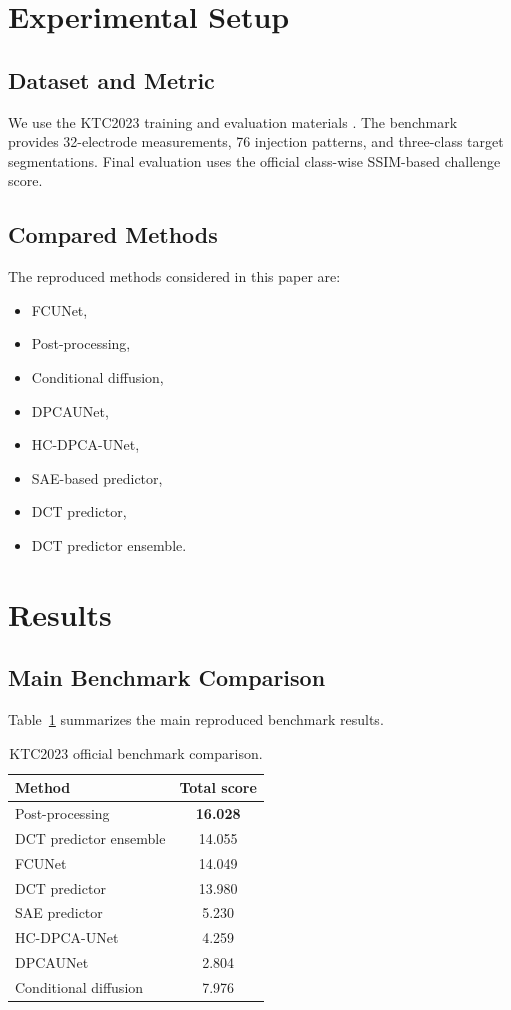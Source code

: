\documentclass[11pt,a4paper]{article}
\begin{document}
\section{Experimental Setup}
\subsection{Dataset and Metric}
We use the KTC2023 training and evaluation materials \cite{rasanen2023kuopio}. The benchmark provides 32-electrode measurements, 76 injection patterns, and three-class target segmentations. Final evaluation uses the official class-wise SSIM-based challenge score.

\subsection{Compared Methods}
The reproduced methods considered in this paper are:
\begin{itemize}[leftmargin=1.5em]
    \item FCUNet,
    \item Post-processing,
    \item Conditional diffusion,
    \item DPCAUNet,
    \item HC-DPCA-UNet,
    \item SAE-based predictor,
    \item DCT predictor,
    \item DCT predictor ensemble.
\end{itemize}

\section{Results}
\subsection{Main Benchmark Comparison}
Table~\ref{tab:ktc-main} summarizes the main reproduced benchmark results.

\begin{table}[htbp]
    \centering
    \caption{KTC2023 official benchmark comparison.}
    \label{tab:ktc-main}
    \begin{tabular}{lc}
        \toprule
        Method & Total score \\
        \midrule
        Post-processing & \textbf{16.028} \\
        DCT predictor ensemble & 14.055 \\
        FCUNet & 14.049 \\
        DCT predictor & 13.980 \\
        SAE predictor & 5.230 \\
        HC-DPCA-UNet & 4.259 \\
        DPCAUNet & 2.804 \\
        Conditional diffusion & 7.976 \\
        \bottomrule
    \end{tabular}
\end{table}
\end{document}

